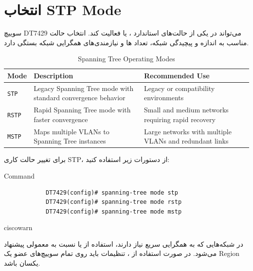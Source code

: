 \documentclass[11pt,letterpaper]{report}
\newenvironment{tipbox}[1]{%
	\begin{noticebox}[title={\textbf{\faLightbulb\ #1}}]{ciscowarn}
	}{%
	\end{noticebox}
}
\begin{document}
	\section{انتخاب STP Mode}

	سوییچ DT7429 می‌تواند در یکی از حالت‌های استاندارد
	،  یا  فعالیت کند. انتخاب حالت مناسب
	به اندازه و پیچیدگی شبکه، تعداد ها و نیازمندی‌های
	همگرایی شبکه بستگی دارد.

	\begin{table}[htbp]
		\centering
		\caption{Spanning Tree Operating Modes}
		\label{tab:stp-operating-modes}
		\begin{tabular}{|p{3.2cm}|p{4.5cm}|p{5.0cm}|}
			\hline
			\textbf{Mode} &
			\textbf{Description} &
			\textbf{Recommended Use} \\
			\hline
			\texttt{STP} &
			Legacy Spanning Tree mode with standard convergence behavior &
			Legacy or compatibility environments \\
			\hline
			\texttt{RSTP} &
			Rapid Spanning Tree mode with faster convergence &
			Small and medium networks requiring rapid recovery \\
			\hline
			\texttt{MSTP} &
			Maps multiple VLANs to Spanning Tree instances &
			Large networks with multiple VLANs and redundant links \\
			\hline
		\end{tabular}
	\end{table}

	برای تغییر حالت کاری STP، از دستورات زیر استفاده کنید:

	\begin{latin}
		\begin{cliexample}{Command}
			\begin{verbatim}
			DT7429(config)# spanning-tree mode stp
			DT7429(config)# spanning-tree mode rstp
			DT7429(config)# spanning-tree mode mstp
			\end{verbatim}
		\end{cliexample}
	\end{latin}

	\begin{tipbox}{پیشنهاد پیکربندی}
		در شبکه‌هایی که به همگرایی سریع نیاز دارند، استفاده از
		 یا  نسبت به  معمولی پیشنهاد می‌شود.
		در صورت استفاده از ، تنظیمات  باید روی
		تمام سوییچ‌های عضو یک Region یکسان باشد.
	\end{tipbox}
\end{document}
